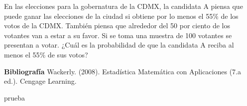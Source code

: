 \documentclass{../oxmathproblems}
\begin{document}
\begin{questions}
\miquestion En las elecciones para la gobernatura de la CDMX, la candidata A piensa que puede ganar las elecciones de la ciudad si obtiene por lo menos el 55$\%$ de los votos de la CDMX. También piensa que alrededor del 50 por ciento de los votantes van a estar a su favor. Si se toma una muestra de 100 votantes se presentan a votar. ¿Cuál es la probabilidad de que la candidata A reciba al menos el 55$\%$ de sus votos?










\textbf{Bibliografía}
Wackerly. (2008). Estadística Matemática con Aplicaciones (7.a ed.). Cengage Learning.

prueba 


\end{questions}
\end{document}
